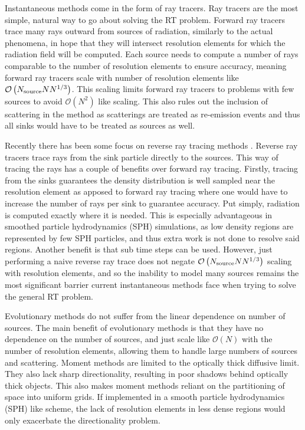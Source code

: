 \documentclass[fleq,usenatbib]{mnras}
\newcommand{\bigO}[1]{\mathcal{O}\left(#1\right)}
\newcommand{\NS}{N_{\rm source}}
\begin{document}
Instantaneous methods come in the form of ray tracers. Ray tracers are the most
 simple, natural way to go about solving the RT problem. Forward ray tracers 
trace many rays outward from sources of radiation, similarly to the actual 
phenomena, in hope that they will intersect resolution elements for which the 
radiation field will be computed. Each source needs to compute a number of rays
 comparable to the number of resolution elements to ensure accuracy, 
meaning forward ray tracers scale with number of resolution elements like 
$\bigO{\NS N N^{1/3}}$. This scaling limits forward ray 
tracers to problems with few sources to avoid $\mathcal{O}(N^2)$ like scaling. 
This also rules out the inclusion of scattering in the method as scatterings 
are treated as re-emission events and thus all sinks would have to be treated 
as sources as well. 

Recently there has been some focus on reverse ray tracing methods 
\citep{clarkEt12, altayTheuns13}. Reverse ray tracers trace rays from the sink 
particle directly to the sources. This way of tracing the rays has a couple of 
benefits over forward ray tracing. Firstly, tracing from the sinks guarantees 
the density distribution is well sampled near the resolution element as 
apposed to forward ray tracing where one would have to increase the number of 
rays per sink to guarantee accuracy. Put simply, radiation is computed exactly 
where it is needed. This is especially advantageous in smoothed particle 
hydrodynamics (SPH) simulations, as low density regions are represented by 
few SPH particles, and thus extra work is not done to resolve said regions. 
Another benefit is that sub time steps can be used. 
However, just performing a naive reverse ray trace does not negate 
$\bigO{\NS N N^{1/3}}$ scaling with resolution elements, and so the inability 
to model many sources remains the most significant barrier current 
instantaneous methods face when trying to solve the general RT problem.

Evolutionary methods do not suffer from the linear dependence on number of 
sources. The main benefit of evolutionary methods is that they have no 
dependence on the number of sources, and just scale like $\mathcal{O}(N)$ with
the number of resolution elements, allowing them to handle large numbers of 
sources and scattering. Moment methods are limited to the optically thick 
diffusive limit. They also lack sharp directionality, resulting in poor shadows
behind optically thick objects. This also makes moment methods reliant on the 
partitioning of space into uniform grids. If implemented in a smooth particle 
hydrodynamics (SPH) like scheme, the lack of resolution elements in less dense 
regions would only exacerbate the directionality problem. 
\end{document}
